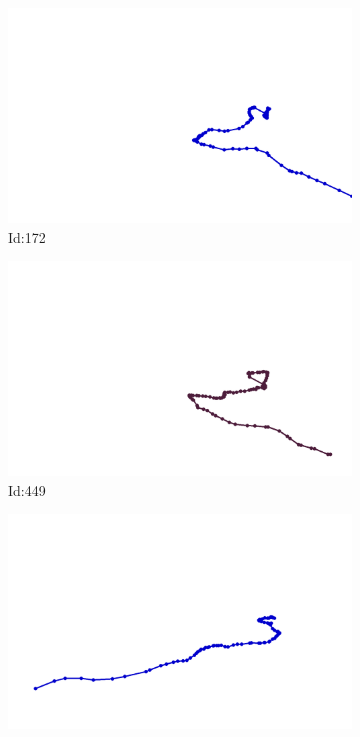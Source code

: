 \documentclass[12pt,twoside]{report}
\begin{document}
\begin{figure}
\centering
\begin{subfigure}[b]{0.20\textwidth}
\centering
\includegraphics[width=\textwidth]{../../trajectories/172.png}
\caption{Id:172}
\end{subfigure}
\begin{subfigure}[b]{0.20\textwidth}
\centering
\includegraphics[width=\textwidth]{../../trajectories/449.png}
\caption{Id:449}
\end{subfigure}
\begin{subfigure}[b]{0.20\textwidth}
\centering
\includegraphics[width=\textwidth]{../../trajectories/480.png}

\end{subfigure}
\end{figure}
\end{document}
